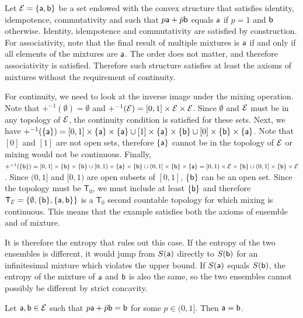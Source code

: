 \begin{example}
	Let $\Ens = \{\ens[a], \ens[b]\}$ be a set endowed with the convex structure that satisfies identity, idempotence, commutativity and such that $p \ens[a] + \bar{p} \ens[b]$ equals $\ens[a]$ if $p=1$ and $\ens[b]$ otherwise. Identity, idempotence and commutativity are satisfied by construction. For associativity, note that the final result of multiple mixtures is $\ens[a]$ if and only if all elements of the mixtures are $\ens[a]$. The order does not matter, and therefore associativity is satisfied. Therefore such structure satisfies at least the axioms of mixtures without the requirement of continuity.
	
	For continuity, we need to look at the inverse image under the mixing operation. Note that $+^{-1}(\emptyset) = \emptyset$ and $+^{-1}(\Ens) = [0,1] \times \Ens \times \Ens$. Since $\emptyset$ and $\Ens$ must be in any topology of $\Ens$, the continuity condition is satisfied for these sets. Next, we have  $+^{-1}(\{\ens[a]\}) = [0,1] \times \{\ens[a]\} \times \{\ens[a]\} \cup [1] \times \{\ens[a]\} \times \{\ens[b]\} \cup [0] \times \{\ens[b]\} \times \{\ens[a]\}$. Note that $[0]$ and $[1]$ are not open sets, therefore $\{\ens[a]\}$ cannot be in the topology of $\Ens$ or mixing would not be continuous. Finally, $+^{-1}(\{\ens[b]\}) = [0,1] \times \{\ens[b]\} \times \{\ens[b]\} \cup [0,1) \times \{\ens[a]\} \times \{\ens[b]\} \cup (0,1] \times \{\ens[b]\} \times \{\ens[a]\} = [0,1) \times \Ens \times \{\ens[b]\} \cup (0,1] \times \{\ens[b]\} \times \Ens$. Since $(0,1]$ and $[0,1)$ are open subsets of $[0,1]$, \{$\ens[b]\}$ can be an open set. Since the topology must be $\textsf{T}_0$, we must include at least $\{\ens[b]\}$ and therefore $\mathsf{T}_{\Ens} = \{\emptyset, \{\ens[b]\}, \{\ens[a], \ens[b]\}\}$ is a $\mathsf{T}_0$ second countable topology for which mixing is continuous. This means that the example satisfies both the axioms of ensemble and of mixture.
\end{example}

It is therefore the entropy that rules out this case. If the entropy of the two ensembles is different, it would jump from $S(\ens[a])$ directly to $S(\ens[b])$ for an infinitesimal mixture which violates the upper bound. If $S(\ens[a])$ equals $S(\ens[b])$, the entropy of the mixture of $\ens[a]$ and $\ens[b]$ is also the same, so the two ensembles cannot possibly be different by strict concavity.

\begin{prop}
	Let $\ens[a], \ens[b] \in \Ens$ such that $p\ens[a] + \bar{p} \ens[b] = \ens[b]$ for some $p \in (0,1]$. Then $\ens[a] = \ens[b]$. 
\end{prop}

